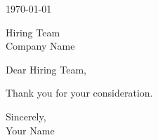 \documentclass[10pt]{article}
\begin{document}

\today

Hiring Team\\
Company Name


Dear Hiring Team,


Thank you for your consideration.

Sincerely,\\
Your Name
\end{document}
